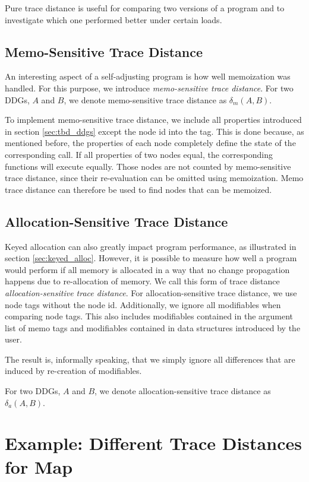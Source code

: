 Pure trace distance is useful for comparing two versions of a program and to investigate which one performed better under certain loads.

\subsection{Memo-Sensitive Trace Distance}

An interesting aspect of a self-adjusting program is how well memoization was handled. For this purpose, we introduce \textit{memo-sensitive trace distance}. For two DDGs, $A$ and $B$, we denote memo-sensitive trace distance as $\delta_m(A, B)$.

To implement memo-sensitive trace distance, we include all properties introduced in section \ref{sec:tbd_ddgs} except the node id into the tag. This is done because, as mentioned before, the properties of each node completely define the state of the corresponding call. If all properties of two nodes equal, the corresponding functions will execute equally. Those nodes are not counted by memo-sensitive trace distance, since their re-evaluation can be omitted using memoization. Memo trace distance can therefore be used to find nodes that can be memoized.  

\subsection{Allocation-Sensitive Trace Distance}

Keyed allocation can also greatly impact program performance, as illustrated in section \ref{sec:keyed_alloc}. However, it is possible to measure how well a program would perform if all memory is allocated in a way that no change propagation happens due to re-allocation of memory. We call this form of trace distance \textit{allocation-sensitive trace distance}. For allocation-sensitive trace distance, we use node tags without the node id. Additionally, we ignore all modifiables when comparing node tags. This also includes modifiables contained in the argument list of memo tags and modifiables contained in data structures introduced by the user.

The result is, informally speaking, that we simply ignore all differences that are induced by re-creation of modifiables.  

For two DDGs, $A$ and $B$, we denote allocation-sensitive trace distance as $\delta_a(A, B)$. 

\section{Example: Different Trace Distances for Map}
\label{sec:trace_distance_unmemoized_map}

